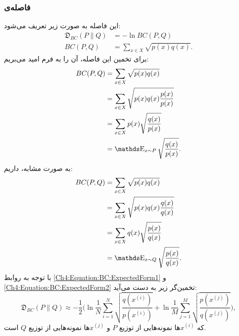 \subsubsection{فاصله‌ی }
این فاصله به صورت زیر تعریف می‌شود:
\begin{equation}
\begin{split}
\mathfrak{D}_{BC}( P \parallel Q) &= - \ln BC(P,Q)\\
BC(P,Q) &= \sum _{{x\in X}}{\sqrt  {p(x)q(x)}}.
\end{split}
\end{equation}
برای تخمین این فاصله، آن را به فرم امید می‌بریم:
\begin{equation}\label{Ch4:Equation:BC:ExpectedForm1}
\begin{split}
BC(P,Q) &= \sum _{x\in X}{\sqrt  {p(x)q(x)}}\\
 &= \sum _{x\in X}{\sqrt  {p(x)q(x) \frac{p(x)}{p(x)}}}\\
  &= \sum _{x\in X}{p(x) \sqrt  {\frac{q(x)}{p(x)}}}\\
  &= \ME _{x\sim P}{\sqrt  {\frac{q(x)}{p(x)}}}.
\end{split}
\end{equation}
به صورت مشابه، داریم:
\begin{equation}\label{Ch4:Equation:BC:ExpectedForm2}
\begin{split}
BC(P,Q) &= \sum _{x\in X}{\sqrt  {p(x)q(x)}}\\
&= \sum _{x\in X}{\sqrt  {p(x)q(x) \frac{q(x)}{q(x)}}}\\
&= \sum _{x\in X}{q(x) \sqrt  {\frac{p(x)}{q(x)}}}\\
&= \ME _{x\sim Q}{\sqrt  {\frac{p(x)}{q(x)}}}.
\end{split}
\end{equation}
با توجه به روابط
\ref{Ch4:Equation:BC:ExpectedForm1}
و
\ref{Ch4:Equation:BC:ExpectedForm2}
تخمین‌گر زیر به دست می‌آید:
\begin{equation}
    \label{Ch4:Equation:BC:Estimator}
   \mathfrak{D}_{BC}( P \parallel Q) \approx
   - \frac{1}{2} \Big(
   \ln \frac{1}{N} \sum_{i=1}^N \sqrt{\frac{q(x^{(i)})}{p(x^{(i)})}} 
    +\ln \frac{1}{M} \sum_{j=1}^M \sqrt{\frac{p(x^{(j)})}{q(x^{(j)})}}
    \Big),
\end{equation}
که 
$x^{(i)}$ها
نمونه‌هایی از توزیع
$P$
و
$x^{(j)}$ها
نمونه‌هایی از توزیع
$Q$
است.
